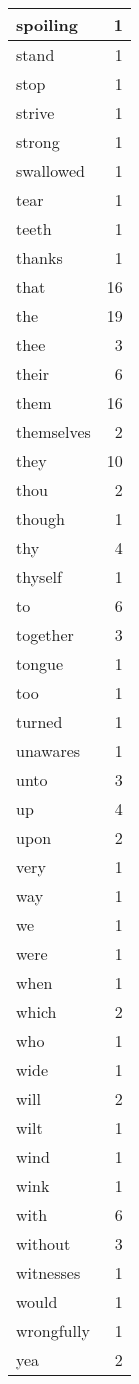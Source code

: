 \begin{center}
\begin{longtable}{l|r}
spoiling & 1 \\ \hline
stand & 1 \\ \hline
stop & 1 \\ \hline
strive & 1 \\ \hline
strong & 1 \\ \hline
swallowed & 1 \\ \hline
tear & 1 \\ \hline
teeth & 1 \\ \hline
thanks & 1 \\ \hline
that & 16 \\ \hline
the & 19 \\ \hline
thee & 3 \\ \hline
their & 6 \\ \hline
them & 16 \\ \hline
themselves & 2 \\ \hline
they & 10 \\ \hline
thou & 2 \\ \hline
though & 1 \\ \hline
thy & 4 \\ \hline
thyself & 1 \\ \hline
to & 6 \\ \hline
together & 3 \\ \hline
tongue & 1 \\ \hline
too & 1 \\ \hline
turned & 1 \\ \hline
unawares & 1 \\ \hline
unto & 3 \\ \hline
up & 4 \\ \hline
upon & 2 \\ \hline
very & 1 \\ \hline
way & 1 \\ \hline
we & 1 \\ \hline
were & 1 \\ \hline
when & 1 \\ \hline
which & 2 \\ \hline
who & 1 \\ \hline
wide & 1 \\ \hline
will & 2 \\ \hline
wilt & 1 \\ \hline
wind & 1 \\ \hline
wink & 1 \\ \hline
with & 6 \\ \hline
without & 3 \\ \hline
witnesses & 1 \\ \hline
would & 1 \\ \hline
wrongfully & 1 \\ \hline
yea & 2 \\ \hline
\end{longtable}
\end{center}



